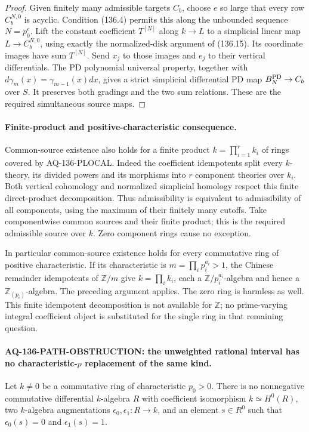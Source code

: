 \documentclass[11pt,a4paper]{article}
\theoremstyle{definition}\newtheorem{definition}[theorem]{Definition}
\theoremstyle{remark}\newtheorem{remark}[theorem]{Remark}
\begin{document}
\begin{proof}
Given finitely many admissible targets $C_b$, choose
$e$ so large that every row $C_b^{N,0}$ is acyclic.
Condition (136.4) permits this along the unbounded
sequence $N=p_0^e$.  Lift the constant coefficient
$T^{[N]}$ along $k\to L$ to a simplicial linear map
$L\to C_b^{N,0}$, using exactly the normalized-disk
argument of (136.15).  Its coordinate images have
sum $T^{[N]}$.  Send $x_j$ to those images and
$e_j$ to their vertical differentials.  The PD
polynomial universal property, together with
$d\gamma_m(x)=\gamma_{m-1}(x)dx$, gives a strict
simplicial differential PD map
$B_N^{\rm PD}\to C_b$ over $S$.
It preserves both gradings and the two sum relations.
These are the required simultaneous source maps.
\end{proof}

\paragraph{Finite-product and positive-characteristic consequence.}
Common-source existence also holds for a finite product
$k=\prod_{i=1}^r k_i$ of rings covered by AQ-136-PLOCAL.
Indeed the coefficient idempotents split every
$k$-theory, its divided powers and its morphisms into
$r$ component theories over $k_i$.
Both vertical cohomology and normalized simplicial
homology respect this finite direct-product decomposition.
Thus admissibility is equivalent to admissibility of all
components, using the maximum of their finitely many
cutoffs.  Take componentwise common sources and their
finite product; this is the required admissible source
over $k$.  Zero component rings cause no exception.

In particular common-source existence holds for every
commutative ring of positive characteristic.  If its
characteristic is $m=\prod_i p_i^{a_i}>1$, the Chinese
remainder idempotents of $\mathbb Z/m$ give
$k=\prod_i k_i$, each a $\mathbb Z/p_i^{a_i}$-algebra
and hence a $\mathbb Z_{(p_i)}$-algebra.  The preceding
argument applies.  The zero ring is harmless as well.
This finite idempotent decomposition is not available
for $\mathbb Z$; no prime-varying integral coefficient
object is substituted for the single ring in that
remaining question.

\paragraph{AQ-136-PATH-OBSTRUCTION: the unweighted rational interval has no characteristic-$p$ replacement of the same kind.}
Let $k\ne0$ be a commutative ring of characteristic
$p_0>0$.  There is no nonnegative commutative differential
$k$-algebra $R$ with coefficient isomorphism
$k\simeq H^0(R)$, two $k$-algebra augmentations
$\epsilon_0,\epsilon_1:R\to k$, and an element
$s\in R^0$ such that $\epsilon_0(s)=0$ and
$\epsilon_1(s)=1$.
\end{document}
